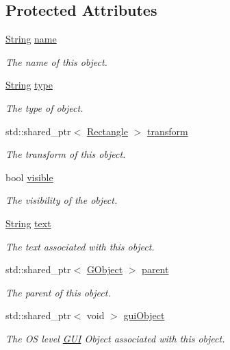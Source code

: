 \subsection*{Protected Attributes}
\begin{DoxyCompactItemize}
\item 
\hyperlink{class_rad_j_a_v_1_1_string}{String} \hyperlink{class_rad_j_a_v_1_1_g_u_i_1_1_g_object_ab9558e5a1d782f881930b297b2ee4ccc}{name}
\begin{DoxyCompactList}\small\item\em The name of this object. \end{DoxyCompactList}\item 
\hyperlink{class_rad_j_a_v_1_1_string}{String} \hyperlink{class_rad_j_a_v_1_1_g_u_i_1_1_g_object_a11b7855ac57a7bfc041b87f0cdd0abd3}{type}
\begin{DoxyCompactList}\small\item\em The type of object. \end{DoxyCompactList}\item 
std\+::shared\+\_\+ptr$<$ \hyperlink{class_rad_j_a_v_1_1_rectangle}{Rectangle} $>$ \hyperlink{class_rad_j_a_v_1_1_g_u_i_1_1_g_object_abfe4fed9fc8c89417082f6c39575b5a3}{transform}
\begin{DoxyCompactList}\small\item\em The transform of this object. \end{DoxyCompactList}\item 
bool \hyperlink{class_rad_j_a_v_1_1_g_u_i_1_1_g_object_a5c9f1e09ab9ed387d0b069e940beed72}{visible}
\begin{DoxyCompactList}\small\item\em The visibility of the object. \end{DoxyCompactList}\item 
\hyperlink{class_rad_j_a_v_1_1_string}{String} \hyperlink{class_rad_j_a_v_1_1_g_u_i_1_1_g_object_a1793a275a95be0b663a00be60f0b6db2}{text}
\begin{DoxyCompactList}\small\item\em The text associated with this object. \end{DoxyCompactList}\item 
std\+::shared\+\_\+ptr$<$ \hyperlink{class_rad_j_a_v_1_1_g_u_i_1_1_g_object}{G\+Object} $>$ \hyperlink{class_rad_j_a_v_1_1_g_u_i_1_1_g_object_aabe842f535f5eb754c7aac935d3dff0d}{parent}
\begin{DoxyCompactList}\small\item\em The parent of this object. \end{DoxyCompactList}\item 
std\+::shared\+\_\+ptr$<$ void $>$ \hyperlink{class_rad_j_a_v_1_1_g_u_i_1_1_g_object_acba108b6a5e5b4560b493c291cdbb7a3}{gui\+Object}
\begin{DoxyCompactList}\small\item\em The OS level \hyperlink{namespace_rad_j_a_v_1_1_g_u_i}{G\+UI} Object associated with this object. \end{DoxyCompactList}\end{DoxyCompactItemize}


